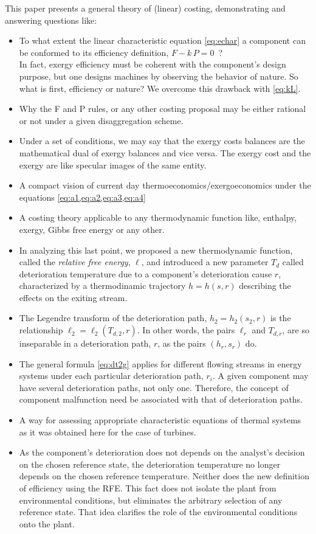 \documentclass[energies,article,submit,moreauthors,pdftex]{Definitions/mdpi}
\begin{document}
This paper presents a general theory of (linear) costing, demonstrating and answering questions like:
\begin{itemize}
	\item To what extent the linear characteristic equation \eqref{eq:echar} a component can be conformed to its efficiency definition, $F - k\, P = 0$~?\\
	In fact, exergy efficiency must be coherent with the component's design purpose, but one designs machines by observing the behavior of nature. So what is first, efficiency or nature? We overcome this drawback with \cref{eq:kL}.
	\item Why the F and P rules, or any other costing proposal may be either rational or not under a given disaggregation scheme.
	\item Under a set of conditions, we may say that the exergy costs balances are the mathematical dual of exergy balances and vice versa. The exergy cost and the exergy are like specular images of the same entity.
	\item A compact vision of current day thermoeconomics/exergoeconomics under the equations \cref{eq:a1,eq:a2,eq:a3,eq:a4}
	\item A costing theory applicable to any thermodynamic function like, enthalpy, exergy, Gibbs free energy or any other.
	\item In analyzing this last point, we proposed a new thermodynamic function, called the \emph{relative free energy}, $\ell$, and introduced a new parameter $T_d$ called deterioration temperature due to a component’s deterioration cause $r$, characterized by a thermodinamic trajectory $h=h(s, r)$ describing the effects on the exiting stream.
	\item The Legendre transform of the deterioration path, $h_2=h_2 (s_2, r)$ is the relationship
	$\ell_2 = \ell_2(T_{d,2} , r)$. In other words, the pairs  $\ell_r$ and $T_{d,r}$, are so inseparable in a deterioration path, $r$, as the pairs $(h_r,s_r)$ do.
	\item The general formula \eqref{eq:dt2g} applies for different flowing streams in energy systems under each particular deterioration path, $r_i$. A given component may have several deterioration paths, not only one. Therefore, the concept of component malfunction need be associated with that of deterioration paths.
	\item A way for assessing appropriate characteristic equations of thermal systems as it was obtained here for the case of  turbines.
	\item As the  component's deterioration  does not  depends on the analyst's decision on the chosen reference state, the deterioration temperature no longer  depends on  the chosen reference temperature.  Neither does the new definition of efficiency using the RFE. This fact does not isolate the plant from environmental conditions, but eliminates the arbitrary selection of any reference state. That idea clarifies the role of the environmental conditions onto the plant.
\end{itemize}
\end{document}
